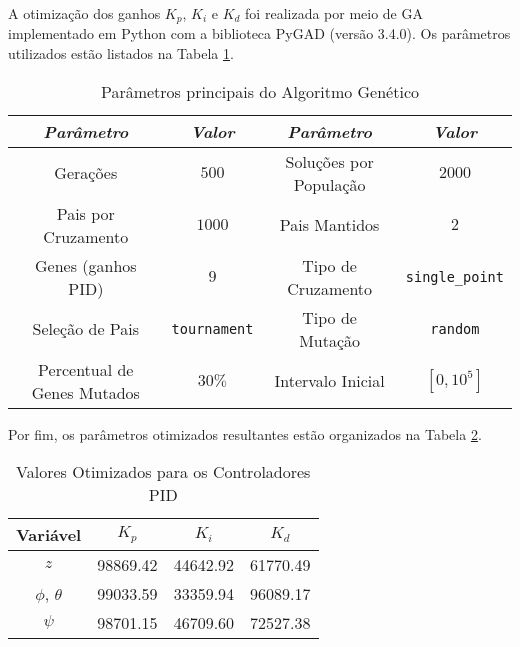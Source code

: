 A otimização dos ganhos $K_p$, $K_i$ e $K_d$ foi realizada por meio de GA implementado em Python 
com a biblioteca PyGAD (versão 3.4.0). Os parâmetros utilizados estão listados na Tabela 
\ref{tab:ga_params_summary}.
\vspace{-0.2cm}
\begin{table}[h!]
    \centering
    \caption{Parâmetros principais do Algoritmo Genético}
    \begin{tabular}{|c|c||c|c|}
        \hline
        \emph{Parâmetro} & \emph{Valor} & \emph{Parâmetro} & \emph{Valor} \\
        \hline
        Gerações & $500$ & Soluções por População & $2000$ \\
        \hline
        Pais por Cruzamento & $1000$ & Pais Mantidos & $2$ \\
        \hline
        Genes (ganhos PID) & $9$ & Tipo de Cruzamento & \texttt{single\_point} \\
        \hline
        Seleção de Pais & \texttt{tournament} & Tipo de Mutação & \texttt{random} \\
        \hline
        Percentual de Genes Mutados & $30\%$ & Intervalo Inicial & $[0, 10^5]$ \\
        \hline
    \end{tabular}
    \label{tab:ga_params_summary}
\end{table}

Por fim, os parâmetros otimizados resultantes estão organizados na Tabela \ref{tab:pid_values}.
\begin{table}[h!]
    \centering
    \caption{Valores Otimizados para os Controladores PID}
    \label{tab:pid_values}
    \begin{tabular}{|c|c|c|c|}
        \hline
        \textbf{Variável} & \textbf{$K_p$} & \textbf{$K_i$} & \textbf{$K_d$} \\ \hline
        $z$              & 98869.42       & 44642.92       & 61770.49       \\ \hline
        $\phi$, $\theta$ & 99033.59       & 33359.94       & 96089.17       \\ \hline
        $\psi$           & 98701.15       & 46709.60       & 72527.38       \\ \hline
    \end{tabular}
\end{table}


